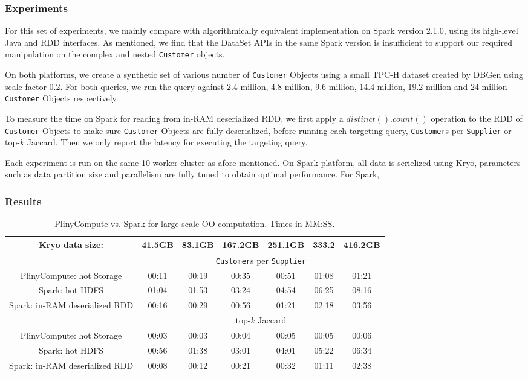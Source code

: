 \subsubsection{Experiments}
For this set of experiments, we mainly compare with algorithmically
equivalent  implementation on Spark version
2.1.0, using its high-level Java and RDD interfaces. As mentioned, we
find that the DataSet APIs in the same Spark version is insufficient
to support our required manipulation on the complex and nested
\texttt{Customer} objects.

On both platforms, we create a synthetic set of various number of \texttt{Customer}
Objects using a small TPC-H dataset created by DBGen using scale
factor 0.2. For both queries, we run the query against 2.4 million,
4.8 million, 9.6 million, 14.4 million, 19.2 million and 24 million
\texttt{Customer} Objects respectively. 

To measure the time on Spark for reading from in-RAM
deserialized RDD, we first apply a $distinct().count()$ operation to
the RDD of \texttt{Customer} Objects to make sure \texttt{Customer}
Objects are fully deserialized, before running each targeting query,
\texttt{Customer}s per \texttt{Supplier} or top-$k$ Jaccard. Then we
only report the latency for executing the targeting query.

Each experiment is run on the same 10-worker cluster as
afore-mentioned. On Spark platform, all data is
serielized using Kryo, parameters such as data partition size and parallelism are fully tuned to obtain
optimal performance. For Spark, 


\subsubsection{Results}


\begin{table}[h!]
\begin{center}
\begin{tabular}{|c||c|c|c|c|c|c|}
\hline
Kryo data size: &41.5GB & 83.1GB & 167.2GB &251.1GB &333.2 &416.2GB \\
\hline
& \multicolumn{6}{c|}{\texttt{Customer}s per \texttt{Supplier}} \\
\hline
PlinyCompute: hot Storage & 00:11&	00:19&	00:35&	00:51&	01:08&	01:21 \\
Spark: hot HDFS & 01:04&	01:53&	03:24&	04:54&	06:25&	08:16\\
Spark: in-RAM deserialized RDD & 00:16& 	00:29& 	00:56& 	01:21& 	02:18& 	03:56\\
\hline
& \multicolumn{6}{c|}{top-$k$ Jaccard} \\
\hline
PlinyCompute: hot Storage & 00:03&	00:03&	00:04&	00:05&	00:05&	00:06 \\
Spark: hot HDFS & 00:56&	01:38&	03:01 & 04:01&	05:22&	06:34\\
Spark: in-RAM deserialized RDD & 00:08& 	00:12& 	00:21 & 00:32& 	01:11& 	02:38\\
\hline
\end{tabular}
\caption{PlinyCompute vs. Spark for large-scale OO computation. Times in MM:SS.}
\label{fig:TPC}
\end{center}
\end{table}

